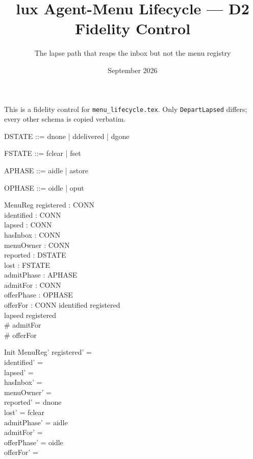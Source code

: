 \documentclass[a4paper,10pt,fleqn]{article}
\begin{document}
\title{lux Agent-Menu Lifecycle --- D2 Fidelity Control}
\author{The lapse path that reaps the inbox but not the menu registry}
\date{September 2026}
\maketitle

This is a fidelity control for \texttt{menu\_lifecycle.tex}. Only
\texttt{DepartLapsed} differs; every other schema is copied verbatim.

\begin{zed}
  [CONN]
\end{zed}

\begin{zed}
  DSTATE ::= dnone | ddelivered | dgone
\end{zed}

\begin{zed}
  FSTATE ::= fclear | fset
\end{zed}

\begin{zed}
  APHASE ::= aidle | astore
\end{zed}

\begin{zed}
  OPHASE ::= oidle | oput
\end{zed}

\begin{schema}{MenuReg}
  registered : \power CONN \\
  identified : \power CONN \\
  lapsed : \power CONN \\
  hasInbox : \power CONN \\
  menuOwner : \power CONN \\
  reported : DSTATE \\
  lost : FSTATE \\
  admitPhase : APHASE \\
  admitFor : \power CONN \\
  offerPhase : OPHASE \\
  offerFor : \power CONN
\where
  identified \subseteq registered \\
  lapsed \subseteq registered \\
  \# admitFor  \\
  \# offerFor 
\end{schema}

\begin{schema}{Init}
  MenuReg'
\where
  registered' = \emptyset \\
  identified' = \emptyset \\
  lapsed' = \emptyset \\
  hasInbox' = \emptyset \\
  menuOwner' = \emptyset \\
  reported' = dnone \\
  lost' = fclear \\
  admitPhase' = aidle \\
  admitFor' = \emptyset \\
  offerPhase' = oidle \\
  offerFor' = \emptyset
\end{schema}
\end{document}
